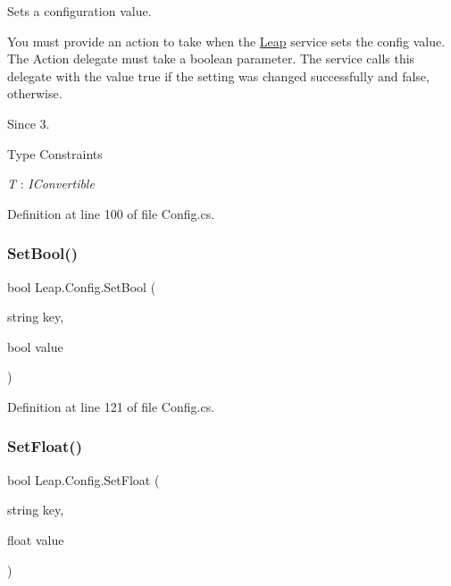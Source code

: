 Sets a configuration value. 

You must provide an action to take when the \mbox{\hyperlink{namespace_leap}{Leap}} service sets the config value. The Action delegate must take a boolean parameter. The service calls this delegate with the value true if the setting was changed successfully and false, otherwise.

\begin{DoxySince}{Since}
3. 
\end{DoxySince}
\begin{Desc}
\item[Type Constraints]\begin{description}
\item[{\em T} : {\em I\+Convertible}]\end{description}
\end{Desc}


Definition at line 100 of file Config.\+cs.

\mbox{\label{class_leap_1_1_config_a48ee08f47555ecc07da20e24c64a34b4}} 
\subsubsection{\texorpdfstring{SetBool()}{SetBool()}}
{\footnotesize\ttfamily bool Leap.\+Config.\+Set\+Bool (\begin{DoxyParamCaption}\item[{string}]{key,  }\item[{bool}]{value }\end{DoxyParamCaption})}



Definition at line 121 of file Config.\+cs.

\mbox{\label{class_leap_1_1_config_aea39b0e2cb819f87d8356ac216a525cb}} 
\subsubsection{\texorpdfstring{SetFloat()}{SetFloat()}}
{\footnotesize\ttfamily bool Leap.\+Config.\+Set\+Float (\begin{DoxyParamCaption}\item[{string}]{key,  }\item[{float}]{value }\end{DoxyParamCaption})}



